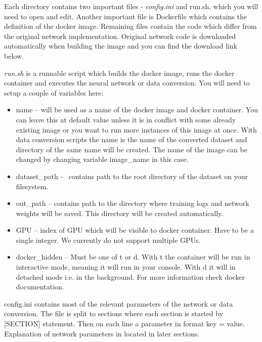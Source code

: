 Each directory contains two important files - \textit{config.ini} and run.sh, which you will need to open and edit. Another important file is Dockerfile which contains the definition of the docker image. Remaining files contain the code which differ from the original network implementation. Original network code is downloaded automatically when building the image and you can find the download link below.

\textit{run.sh} is a runnable script which builds the docker image, runs the docker container and executes the neural network or data conversion. You will need to setup a couple of variables here:

\begin{itemize}
	\item  {name -- will be used as a name of the docker image and docker container. You can leave this at default value unless it is in conflict with some already existing image or you want to run more instances of this image at once. With data conversion scripts the name is the name of the converted dataset and directory of the same name will be created. The name of the image can be changed by changing variable image\_name in this case.}
	\item{ dataset\_path -  contains path to the root directory of the dataset on your filesystem.}
	\item{out\_path -- contains path to the directory where training logs and network weights will be saved. This directory will be created automatically.}
	\item{ GPU -- index of GPU which will be visible to docker container. Have to be a single integer. We currently do not support multiple GPUs.}
	\item{docker\_hidden -- Must be one of t or d. With t the container will be run in interactive mode, meaning it will run in your console. With d it will in detached mode i.e. in the background. For more information check docker documentation.}
\end{itemize}

config.ini contains most of the relevant parameters of the network or data conversion. The file is split to sections where each section is started by [SECTION] statement. Then on each line a parameter in format key = value. Explanation of network parameters in located in later sections.

